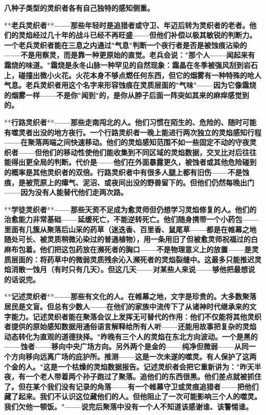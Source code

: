 \documentclass[12pt,a4paper,openany]{ctexbook}
\begin{document}
\textbf{八种子类型的灵织者各有自己独特的感知侧重。}


**\textbf{老兵灵织者}**\textbf{——那些年轻时是追猎者或守卫、年迈后转为灵织者的老者。他们的灵焰经过几十年的战斗已经不再旺盛——但他们补偿以极其敏锐的判断力。一个老兵灵织者能在三息之内通过"气息"判断一个夜行者是否是被蚀痕沾染的——不是用察灵，而是靠一种更原始的直觉。老兵会说："那个人——闻起来有霜烧的味道。"霜烧是永冬山脉一种罕见的自然现象：霜晶在冬季被强风刮到岩石上，碰撞出微小火花。火花本身不够点燃任何东西，但它的烟雾有一种特殊的呛人气息。老兵灵织者用这个名字来形容蚀痕在灵质层面的"气味"——因为它像霜烧的烟雾一样——不是你"闻到"的，是你从脖子后面一阵突如其来的麻痒感觉到的。}


**\textbf{行路灵织者}**\textbf{——那些走南闯北的人。他们习惯在陌生的、危险的、随时可能有噬灵者出没的地方夜行。一个行路灵织者一晚上能进行两次独立的灵焰感知行程——在聚落两端之间快速移动。他们的灵焰感知范围不如一些固定不动的守夜灵织者——但他们的移动性使他们能收集到不同区域的灵焰数据，交叉比对后往往能得出更全局的判断。代价是——他们在外面暴露更久，被蚀者或其他危险碰到的概率是其他灵织者的双倍。行路灵织者中有很多人腿上都有旧伤——不是蚀痕，是被荒原上的瘴气、泥沼、或夜间出没的野兽留下的。但他们仍然每晚出门——因为没有人能替代他们走两次路。}


**\textbf{学徒灵织者}**\textbf{——那些天资不足成为愈灵师但仍想学习灵焰修复的人。他们的治愈能力非常基础——延缓死亡，不能逆转死亡。他们随身携带一个小药包——里面有几簇从聚落后山采的药草（迷迭香、百里香、鼠尾草——都是在帷幕之地随处可长、被灵质稍微沁染过的普通植物），用一条用旧了但被愈灵师祝福过的白麻布包着。他们把这包药放在濒死者的胸口——不是物理意义上的放置——是灵质层面的：将药草中的微弱灵质残余沁入濒死者的灵焰裂缝中。这最多只能推迟灵焰消散一蚀月（有时只有几天）。但这几天——对某些人来说——够他把最想说的话说完。}


**\textbf{记述灵织者}**\textbf{——那些有文化的人。在帷幕之地，文字是珍贵的。大多数聚落居民是文盲。但总有少数人——在他们的家族中流传下了从诸神时代继承来的文字能力。记述灵织者能在聚落会议上发挥无可替代的作用：他们不仅能将其他灵织者提供的原始感知数据用通俗语言解释给所有人听——还能用故事把复杂的灵焰动态转化为直观的道德抉择。"昨晚有三个人的灵焰在东北方向波动。一个是黑的——蚀者——移向中央广场方向。另外两个是金的——纯净但微弱——从同一个方向移向远离广场的庇护所。推测——这是一次未遂的噬灵。有人保护了这两个金的人。"这是一个枯燥的灵焰数据报告。记述灵织者会把它重新讲为："昨天半夜，有一个老人带着两个孙子跑过了聚落。追他们的东西很黑。他们差点就被抓住了。但在某个我们没有记录的角落——有一个帷幕守卫或灵痕追猎者——把他们藏了起来。我们不认识这位藏他们的人。但他阻止了一次可能影响三个人的噬灵。我们欠他一顿饭。"——说完后聚落中没有一个人不知道该感谢谁、该警惕谁。}
\end{document}
